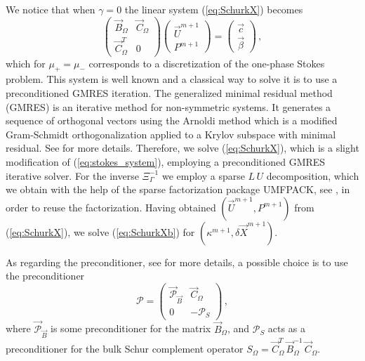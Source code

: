 We notice that when $\gamma = 0$ the linear system (\ref{eq:SchurkX}) becomes
\begin{equation} \label{eq:stokes_system}
\begin{pmatrix}
\vec B_\Omega & \vec C_\Omega \\
\vec C_\Omega^T & 0
\end{pmatrix}
\begin{pmatrix}
\vec U^{m+1} \\ P^{m+1}
\end{pmatrix}
= \begin{pmatrix}
\vec c \\
\vec \beta
\end{pmatrix}\,,
\end{equation}
which for $\mu_+=\mu_-$ corresponds to a discretization of the one-phase
Stokes problem. This system is well known and a classical way to solve it is to
use a preconditioned GMRES iteration. The generalized minimal residual method
(GMRES) is an iterative method for non-symmetric systems. It generates a
sequence of orthogonal vectors using the Arnoldi method which is a modified
Gram-Schmidt orthogonalization applied to a Krylov subspace with minimal
residual. See \cite{BarrettBCetal94} for more details. Therefore, we solve
(\ref{eq:SchurkX}), which is a slight modification of (\ref{eq:stokes_system}),
employing a preconditioned GMRES iterative solver. For the inverse
$\Xi_\Gamma^{-1}$ we employ a sparse $L\,U$ decomposition, which we obtain with
the help of the sparse factorization package UMFPACK, see \cite{Davis04}, in
order to reuse the factorization. Having obtained $(\vec U^{m+1}, P^{m+1})$ from
(\ref{eq:SchurkX}), we solve (\ref{eq:SchurkXb}) for $(\kappa^{m+1}, \delta\vec
X^{m+1})$.

As regarding the preconditioner, see \cite{ElmanSW05} for more details, a
possible choice is to use the preconditioner
\begin{equation} \label{eq:ESW}
\mathcal{P} = \begin{pmatrix}
\vec{\mathcal{P}}_{\vec B} & \vec C_\Omega \\
0 & -\mathcal{P}_S
\end{pmatrix}\,,
\end{equation}
where $\vec{\mathcal{P}}_{\vec B}$ is some preconditioner for the matrix $\vec
B_\Omega$, and $\mathcal{P}_S$ acts as a preconditioner for the bulk Schur
complement operator $S_\Omega=\vec C^T_\Omega \,\vec B_\Omega^{-1}\,\vec
C_\Omega$.

